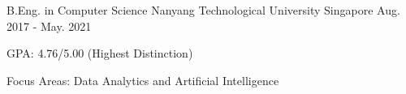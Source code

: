 

\begin{cventries}

  \cventry
    {B.Eng. in Computer Science} %
    {Nanyang Technological University} %
    {Singapore} %
    {Aug. 2017 - May. 2021} %
    {
      \begin{cvitems} %
        \item {GPA: 4.76/5.00 (Highest Distinction)}
        \item {Focus Areas: Data Analytics and Artificial Intelligence}
      \end{cvitems}
    }


\end{cventries}
